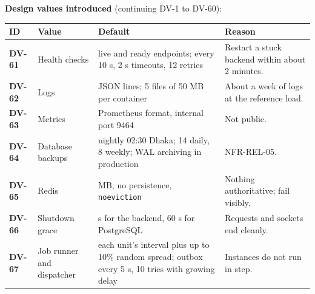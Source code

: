 \documentclass[11pt,a4paper]{article}
\newenvironment{dtable}[1]{\small\begin{longtable}{#1}}{\end{longtable}}
\begin{document}
\textbf{Design values introduced} (continuing DV-1 to DV-60):
\begin{dtable}{@{}>{\bfseries}p{1.3cm}>{\raggedright\arraybackslash}p{4.4cm}>{\raggedright\arraybackslash}p{5.0cm}>{\raggedright\arraybackslash}p{4.2cm}@{}}
\toprule
\textnormal{\textbf{ID}} & \textbf{Value} & \textbf{Default} & \textbf{Reason} \\ \midrule \endhead
DV-61 & Health checks & live and ready endpoints; every 10 s, 2 s timeouts, 12 retries & Restart a stuck backend within about 2 minutes. \\
DV-62 & Logs & JSON lines; 5 files of 50 MB per container & About a week of logs at the reference load. \\
DV-63 & Metrics & Prometheus format, internal port 9464 & Not public. \\
DV-64 & Database backups & nightly 02:30 Dhaka; 14 daily, 8 weekly; WAL archiving in production & NFR-REL-05. \\
DV-65 & Redis & 256 MB, no persistence, \texttt{noeviction} & Nothing authoritative; fail visibly. \\
DV-66 & Shutdown grace & 30 s for the backend, 60 s for PostgreSQL & Requests and sockets end cleanly. \\
DV-67 & Job runner and dispatcher & each unit's interval plus up to 10\% random spread; outbox every 5 s, 10 tries with growing delay & Instances do not run in step. \\
\bottomrule
\end{dtable}
\end{document}

